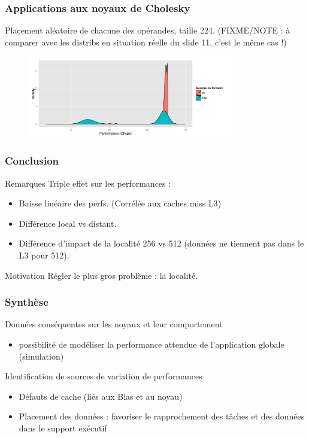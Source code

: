 \documentclass[xcolor={usenames,dvipsnames,svgnames,table}, aspectratio=43]{beamer}
\begin{document}
\begin{frame}
\frametitle{Applications aux noyaux de Cholesky}

Placement aléatoire de chacune des opérandes, taille 224.
(FIXME/NOTE : à comparer avec les distribs en situation réelle du slide 11, c'est le même cas !)

\begin{figure}
  \centering
  \includegraphics[width=0.8\textwidth]{graph/distrib_random_tool.pdf}
\end{figure}

\end{frame}


\begin{frame}
  \frametitle{Conclusion}
  \begin{block}{Remarques}
    Triple effet sur les performances :
    \begin{itemize}
      \item Baisse linéaire des perfs. (Corrélée aux caches miss L3)
      \item Différence local vs distant.
      \item Différence d'impact de la localité 256 vs 512 (données ne tiennent pas dans le L3 pour 512).
    \end{itemize}
  \end{block}

  \begin{block}{Motivation}
    Régler le plus gros problème : la localité.
  \end{block}

\end{frame}

\begin{frame}
\frametitle{Synthèse}


Données conséquentes sur les noyaux et leur comportement

\begin{itemize}
  \item possibilité de modéliser la performance attendue de l'application globale (simulation)
\end{itemize}

Identification de sources de variation de performances

\begin{itemize}
  \item Défauts de cache (liés aux Blas et au noyau)
  \item Placement des données : favoriser le rapprochement des tâches et des données dans le support exécutif
\end{itemize}

\end{frame}
\end{document}
